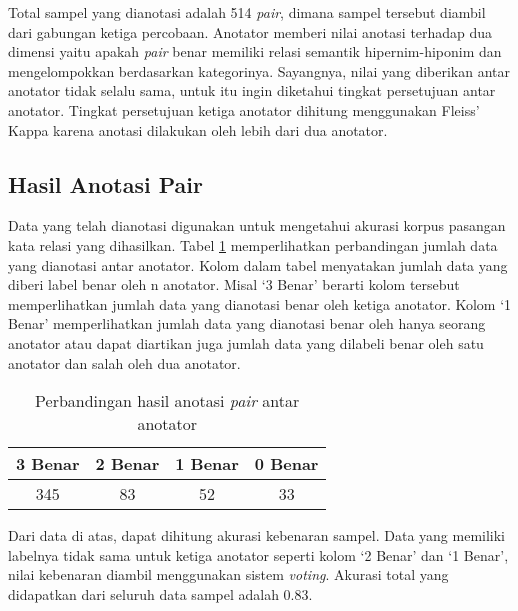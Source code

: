 Total sampel yang dianotasi adalah 514 \textit{pair}, dimana sampel tersebut diambil dari gabungan ketiga percobaan. Anotator memberi nilai anotasi terhadap dua dimensi yaitu apakah \textit{pair} benar memiliki relasi semantik hipernim-hiponim dan mengelompokkan berdasarkan kategorinya. Sayangnya, nilai yang diberikan antar anotator tidak selalu sama, untuk itu ingin diketahui tingkat persetujuan antar anotator. Tingkat persetujuan ketiga anotator dihitung menggunakan Fleiss' Kappa karena anotasi dilakukan oleh lebih dari dua anotator.

\subsection{Hasil Anotasi Pair}
Data yang telah dianotasi digunakan untuk mengetahui akurasi korpus pasangan kata relasi yang dihasilkan. Tabel \ref{table:jumlah-bs} memperlihatkan perbandingan jumlah data yang dianotasi antar anotator. Kolom dalam tabel menyatakan jumlah data yang diberi label benar oleh n anotator. Misal `3 Benar' berarti kolom tersebut memperlihatkan jumlah data yang dianotasi benar oleh ketiga anotator. Kolom `1 Benar' memperlihatkan jumlah data yang dianotasi benar oleh hanya seorang anotator atau dapat diartikan juga jumlah data yang dilabeli benar oleh satu anotator dan salah oleh dua anotator.

\begin{table}
  \centering
  \caption{Perbandingan hasil anotasi \textit{pair} antar anotator}
  \label{table:jumlah-bs}
  \begin{tabular}{|c|c|c|c|}
  \hline
  3 Benar & 2 Benar & 1 Benar & 0 Benar \\ \hline
  345 & 83 & 52 & 33 \\ \hline
  \end{tabular} 
\end{table}

Dari data di atas, dapat dihitung akurasi kebenaran sampel. Data yang memiliki labelnya tidak sama untuk ketiga anotator seperti kolom `2 Benar' dan `1 Benar', nilai kebenaran diambil menggunakan sistem \textit{voting}. Akurasi total yang didapatkan dari seluruh data sampel adalah 0.83.

